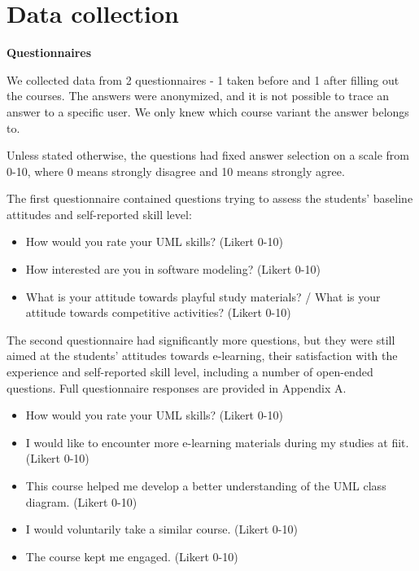 \section{Data collection}

\textbf{Questionnaires}

We collected data from 2 questionnaires - 1 taken before and 1 after filling out the courses. The answers were anonymized, and it is not possible to trace an answer to a specific user. We only knew which course variant the answer belongs to.

Unless stated otherwise, the questions had fixed answer selection on a scale from 0-10, where 0 means strongly disagree and 10 means strongly agree.

The first questionnaire contained questions trying to assess the students' baseline attitudes and self-reported skill level:	

\begin{itemize}
    \item How would you rate your UML skills? (Likert 0-10)
    \item How interested are you in software modeling? (Likert 0-10)
    \item What is your attitude towards playful study materials? / What is your attitude towards competitive activities? (Likert 0-10)
\end{itemize}

The second questionnaire had significantly more questions, but they were still aimed at the students' attitudes towards e-learning, their satisfaction with the experience and self-reported skill level, including a number of open-ended questions. Full questionnaire responses are provided in Appendix A.

\begin{itemize}
    \item How would you rate your UML skills? (Likert 0-10)
    \item I would like to encounter more e-learning materials during my studies at \ac{fiit}. (Likert 0-10)
    \item This course helped me develop a better understanding of the UML class diagram. (Likert 0-10)
    \item I would voluntarily take a similar course. (Likert 0-10)
    \item The course kept me engaged. (Likert 0-10)
\end{itemize}

